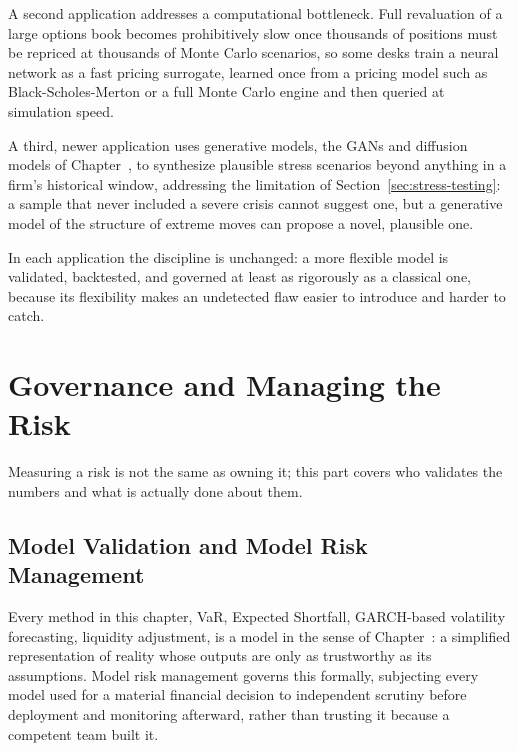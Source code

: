 \documentclass[../ai_in_finance]{subfiles}
\begin{document}
A second application addresses a computational bottleneck. Full revaluation of a large options book becomes prohibitively slow once thousands of positions must be repriced at thousands of Monte Carlo scenarios, so some desks train a neural network as a fast pricing surrogate, learned once from a pricing model such as Black-Scholes-Merton or a full Monte Carlo engine and then queried at simulation speed.

A third, newer application uses generative models, the GANs and diffusion models of Chapter~, to synthesize plausible stress scenarios beyond anything in a firm's historical window, addressing the limitation of Section~\ref{sec:stress-testing}: a sample that never included a severe crisis cannot suggest one, but a generative model of the structure of extreme moves can propose a novel, plausible one.

In each application the discipline is unchanged: a more flexible model is validated, backtested, and governed at least as rigorously as a classical one, because its flexibility makes an undetected flaw easier to introduce and harder to catch.

\section{Governance and Managing the Risk}

Measuring a risk is not the same as owning it; this part covers who validates the numbers and what is actually done about them.

\subsection{Model Validation and Model Risk Management}
\label{sec:model-validation}

Every method in this chapter, VaR, Expected Shortfall, GARCH-based volatility forecasting, liquidity adjustment, is a model in the sense of Chapter~: a simplified representation of reality whose outputs are only as trustworthy as its assumptions. Model risk management governs this formally, subjecting every model used for a material financial decision to independent scrutiny before deployment and monitoring afterward, rather than trusting it because a competent team built it.
\end{document}
